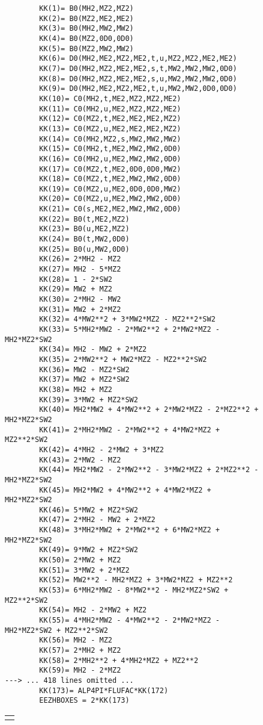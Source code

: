 \begin{figure}[H]
\begin{scriptsize}
\begin{verbatim}
        KK(1)= B0(MH2,MZ2,MZ2)
        KK(2)= B0(MZ2,ME2,ME2)
        KK(3)= B0(MH2,MW2,MW2)
        KK(4)= B0(MZ2,0D0,0D0)
        KK(5)= B0(MZ2,MW2,MW2)
        KK(6)= D0(MH2,ME2,MZ2,ME2,t,u,MZ2,MZ2,ME2,ME2)
        KK(7)= D0(MH2,MZ2,ME2,ME2,s,t,MW2,MW2,MW2,0D0)
        KK(8)= D0(MH2,MZ2,ME2,ME2,s,u,MW2,MW2,MW2,0D0)
        KK(9)= D0(MH2,ME2,MZ2,ME2,t,u,MW2,MW2,0D0,0D0)
        KK(10)= C0(MH2,t,ME2,MZ2,MZ2,ME2)
        KK(11)= C0(MH2,u,ME2,MZ2,MZ2,ME2)
        KK(12)= C0(MZ2,t,ME2,ME2,ME2,MZ2)
        KK(13)= C0(MZ2,u,ME2,ME2,ME2,MZ2)
        KK(14)= C0(MH2,MZ2,s,MW2,MW2,MW2)
        KK(15)= C0(MH2,t,ME2,MW2,MW2,0D0)
        KK(16)= C0(MH2,u,ME2,MW2,MW2,0D0)
        KK(17)= C0(MZ2,t,ME2,0D0,0D0,MW2)
        KK(18)= C0(MZ2,t,ME2,MW2,MW2,0D0)
        KK(19)= C0(MZ2,u,ME2,0D0,0D0,MW2)
        KK(20)= C0(MZ2,u,ME2,MW2,MW2,0D0)
        KK(21)= C0(s,ME2,ME2,MW2,MW2,0D0)
        KK(22)= B0(t,ME2,MZ2)
        KK(23)= B0(u,ME2,MZ2)
        KK(24)= B0(t,MW2,0D0)
        KK(25)= B0(u,MW2,0D0)
        KK(26)= 2*MH2 - MZ2
        KK(27)= MH2 - 5*MZ2
        KK(28)= 1 - 2*SW2
        KK(29)= MW2 + MZ2
        KK(30)= 2*MH2 - MW2
        KK(31)= MW2 + 2*MZ2
        KK(32)= 4*MW2**2 + 3*MW2*MZ2 - MZ2**2*SW2
        KK(33)= 5*MH2*MW2 - 2*MW2**2 + 2*MW2*MZ2 - MH2*MZ2*SW2
        KK(34)= MH2 - MW2 + 2*MZ2
        KK(35)= 2*MW2**2 + MW2*MZ2 - MZ2**2*SW2
        KK(36)= MW2 - MZ2*SW2
        KK(37)= MW2 + MZ2*SW2
        KK(38)= MH2 + MZ2
        KK(39)= 3*MW2 + MZ2*SW2
        KK(40)= MH2*MW2 + 4*MW2**2 + 2*MW2*MZ2 - 2*MZ2**2 + MH2*MZ2*SW2
        KK(41)= 2*MH2*MW2 - 2*MW2**2 + 4*MW2*MZ2 + MZ2**2*SW2
        KK(42)= 4*MH2 - 2*MW2 + 3*MZ2
        KK(43)= 2*MW2 - MZ2
        KK(44)= MH2*MW2 - 2*MW2**2 - 3*MW2*MZ2 + 2*MZ2**2 - MH2*MZ2*SW2
        KK(45)= MH2*MW2 + 4*MW2**2 + 4*MW2*MZ2 + MH2*MZ2*SW2
        KK(46)= 5*MW2 + MZ2*SW2
        KK(47)= 2*MH2 - MW2 + 2*MZ2
        KK(48)= 3*MH2*MW2 + 2*MW2**2 + 6*MW2*MZ2 + MH2*MZ2*SW2
        KK(49)= 9*MW2 + MZ2*SW2
        KK(50)= 2*MW2 + MZ2
        KK(51)= 3*MW2 + 2*MZ2
        KK(52)= MW2**2 - MH2*MZ2 + 3*MW2*MZ2 + MZ2**2
        KK(53)= 6*MH2*MW2 - 8*MW2**2 - MH2*MZ2*SW2 + MZ2**2*SW2
        KK(54)= MH2 - 2*MW2 + MZ2
        KK(55)= 4*MH2*MW2 - 4*MW2**2 - 2*MW2*MZ2 - MH2*MZ2*SW2 + MZ2**2*SW2
        KK(56)= MH2 - MZ2
        KK(57)= 2*MH2 + MZ2
        KK(58)= 2*MH2**2 + 4*MH2*MZ2 + MZ2**2
        KK(59)= MH2 - 2*MZ2
---> ... 418 lines omitted ...
        KK(173)= ALP4PI*FLUFAC*KK(172)
        EEZHBOXES = 2*KK(173)

\end{verbatim}
\end{scriptsize}
\begin{tabular*}{0.8\textwidth}{c}\hhline\end{tabular*}
\end{figure}


